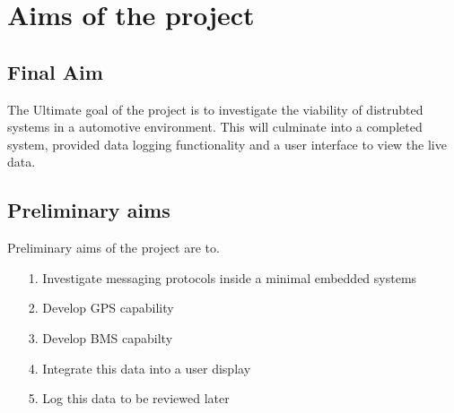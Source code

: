 
\chapter{Aims of the project} %



\section{Final Aim}

The Ultimate goal of the project is to investigate the viability of distrubted systems in a automotive environment. This will culminate into a completed system, provided data logging functionality and a user interface to view the live data. \cite{citeulike:9725737}

\section{Preliminary aims}

Preliminary aims of the project are to.

\begin{itemize}
\item[1. Investigate messaging protocols inside a minimal embedded systems]
\item[2. Develop GPS capability]
\item[3. Develop BMS capabilty]
\item[4. Integrate this data into a user display]
\item[5. Log this data to be reviewed later]
\end{itemize}



